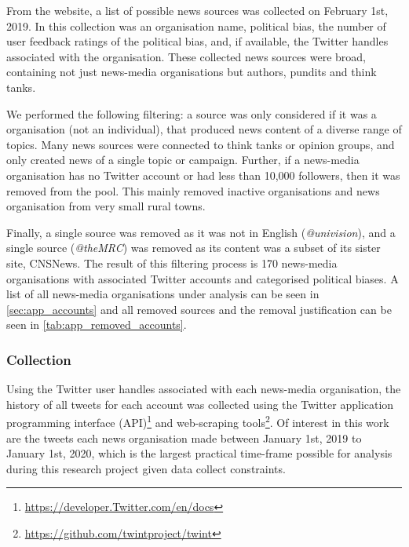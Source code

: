 From the website, a list of possible news sources was collected on February 1st, 2019. In this collection was an organisation name, political bias, the number of user feedback ratings of the political bias, and, if available, the Twitter handles associated with the organisation. These collected news sources were broad, containing not just news-media organisations but authors, pundits and think tanks. 

We performed the following filtering: a source was only considered if it was a organisation (not an individual), that produced news content of a diverse range of topics. Many news sources were connected to think tanks or opinion groups, and only created news of a single topic or campaign. Further, if a news-media organisation has no Twitter account or had less than 10,000 followers, then it was removed from the pool. This mainly removed inactive organisations and news organisation from very small rural towns. 

Finally, a single source was removed as it was not in English (\emph{@univision}), and a single source (\emph{@theMRC}) was removed as its content was a subset of its sister site, CNSNews.  The result of this filtering process is 170 news-media organisations with associated Twitter accounts and categorised political biases.  A list of all news-media organisations under analysis can be seen in \autoref{sec:app_accounts} and all removed sources and the removal justification can be seen in \autoref{tab:app_removed_accounts}.

\subsubsection{Collection}
Using the Twitter user handles associated with each news-media organisation, the history of all tweets for each account was collected using the Twitter application programming interface (API)\footnote{\url{https://developer.Twitter.com/en/docs}} and web-scraping tools\footnote{\url{https://github.com/twintproject/twint}}. Of interest in this work are the tweets each news organisation made between January 1st, 2019 to January 1st, 2020, which is the largest practical time-frame possible for analysis during this research project given data collect constraints. 

